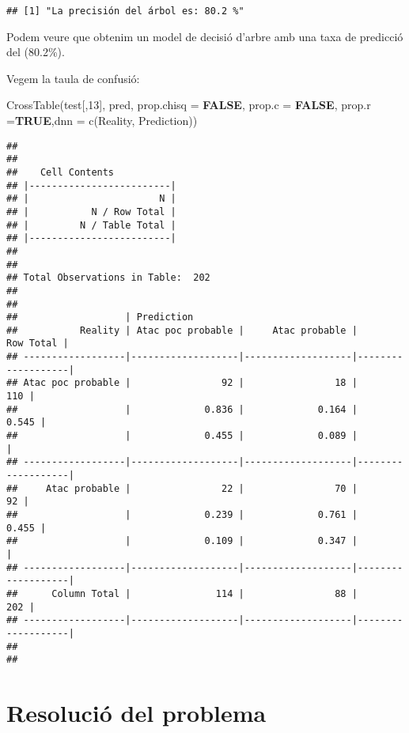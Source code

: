 \documentclass[
]{article}
\newenvironment{Shaded}{\begin{snugshade}}{\end{snugshade}}
\newcommand{\AttributeTok}[1]{\textcolor[rgb]{0.80,0.80,0.80}{#1}}
\newcommand{\ConstantTok}[1]{\textcolor[rgb]{0.86,0.64,0.64}{\textbf{#1}}}
\newcommand{\DecValTok}[1]{\textcolor[rgb]{0.86,0.86,0.80}{#1}}
\newcommand{\FunctionTok}[1]{\textcolor[rgb]{0.94,0.94,0.56}{#1}}
\newcommand{\NormalTok}[1]{\textcolor[rgb]{0.80,0.80,0.80}{#1}}
\newcommand{\StringTok}[1]{\textcolor[rgb]{0.80,0.58,0.58}{#1}}
\begin{document}
\begin{verbatim}
## [1] "La precisión del árbol es: 80.2 %"
\end{verbatim}

Podem veure que obtenim un model de decisió d'arbre amb una taxa de
predicció del (80.2\%).

Vegem la taula de confusió:

\begin{Shaded}
\begin{Highlighting}[]
\FunctionTok{CrossTable}\NormalTok{(test[,}\DecValTok{13}\NormalTok{], pred, }\AttributeTok{prop.chisq  =} \ConstantTok{FALSE}\NormalTok{, }\AttributeTok{prop.c =} \ConstantTok{FALSE}\NormalTok{, }\AttributeTok{prop.r =}\ConstantTok{TRUE}\NormalTok{,}\AttributeTok{dnn =} \FunctionTok{c}\NormalTok{(}\StringTok{\textquotesingle{}Reality\textquotesingle{}}\NormalTok{, }\StringTok{\textquotesingle{}Prediction\textquotesingle{}}\NormalTok{))}
\end{Highlighting}
\end{Shaded}

\begin{verbatim}
## 
##  
##    Cell Contents
## |-------------------------|
## |                       N |
## |           N / Row Total |
## |         N / Table Total |
## |-------------------------|
## 
##  
## Total Observations in Table:  202 
## 
##  
##                   | Prediction 
##           Reality | Atac poc probable |     Atac probable |         Row Total | 
## ------------------|-------------------|-------------------|-------------------|
## Atac poc probable |                92 |                18 |               110 | 
##                   |             0.836 |             0.164 |             0.545 | 
##                   |             0.455 |             0.089 |                   | 
## ------------------|-------------------|-------------------|-------------------|
##     Atac probable |                22 |                70 |                92 | 
##                   |             0.239 |             0.761 |             0.455 | 
##                   |             0.109 |             0.347 |                   | 
## ------------------|-------------------|-------------------|-------------------|
##      Column Total |               114 |                88 |               202 | 
## ------------------|-------------------|-------------------|-------------------|
## 
## 
\end{verbatim}

\hypertarget{resoluciuxf3-del-problema}{%
\section{Resolució del problema}\label{resoluciuxf3-del-problema}}
\end{document}
